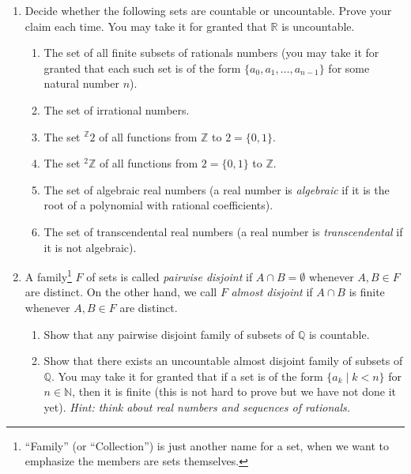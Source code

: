 \documentclass{amsart}
\theoremstyle{definition}
\newcommand{\fct}[2]{{}^{#1} {#2}}
\newcommand{\Nn}{\mathbb{N}}
\newcommand{\Zz}{\mathbb{Z}}
\newcommand{\Qq}{\mathbb{Q}}
\newcommand{\Rr}{\mathbb{R}}
\begin{document}
\begin{enumerate}
\item Decide whether the following sets are countable or uncountable. Prove your claim each time. You may take it for granted that $\Rr$ is uncountable.

  \begin{enumerate}
  \item The set of all finite subsets of rationals numbers (you may take it for granted that each such set is of the form $\{a_0, a_1, \ldots, a_{n - 1}\}$ for some natural number $n$).
  \item The set of irrational numbers.
  \item The set $\fct{\Zz}{2}$ of all functions from $\Zz$ to $2 = \{0,1\}$.
  \item The set $\fct{2}{\Zz}$ of all functions from $2 = \{0, 1\}$ to $\Zz$.
  \item The set of algebraic real numbers (a real number is \emph{algebraic} if it is the root of a polynomial with rational coefficients).
  \item The set of transcendental real numbers (a real number is \emph{transcendental} if it is not algebraic).
  \end{enumerate}
  
\item A family\footnote{``Family'' (or ``Collection'') is just another name for a set, when we want to emphasize the members are sets themselves.} $F$ of sets is called \emph{pairwise disjoint} if $A \cap B = \emptyset$ whenever $A, B \in F$ are distinct. On the other hand, we call $F$ \emph{almost disjoint} if $A \cap B$ is finite whenever $A, B \in F$ are distinct.

  \begin{enumerate}
  \item Show that any pairwise disjoint family of subsets of $\Qq$ is countable.
  \item Show that there exists an uncountable almost disjoint family of subsets of $\Qq$. You may take it for granted that if a set is of the form $\{a_k \mid k < n\}$ for $n \in \Nn$, then it is finite (this is not hard to prove but we have not done it yet). \emph{Hint: think about real numbers and sequences of rationals.}
  \end{enumerate}
  
  
\end{enumerate}
\end{document}
